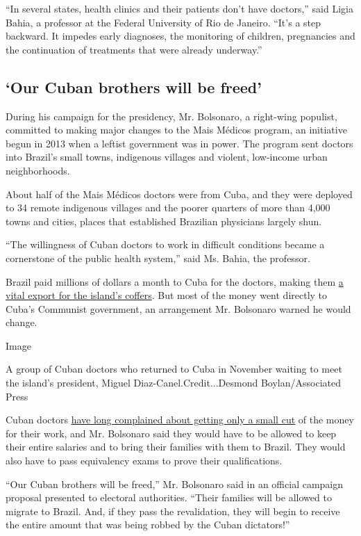``In several states, health clinics and their patients don't have
doctors,'' said Ligia Bahia, a professor at the Federal University of
Rio de Janeiro. ``It's a step backward. It impedes early diagnoses, the
monitoring of children, pregnancies and the continuation of treatments
that were already underway.''

\hypertarget{our-cuban-brothers-will-be-freed}{%
\subsection{`Our Cuban brothers will be
freed'}\label{our-cuban-brothers-will-be-freed}}

During his campaign for the presidency, Mr. Bolsonaro, a right-wing
populist, committed to making major changes to the Mais Médicos program,
an initiative begun in 2013 when a leftist government was in power. The
program sent doctors into Brazil's small towns, indigenous villages and
violent, low-income urban neighborhoods.

About half of the Mais Médicos doctors were from Cuba, and they were
deployed to 34 remote indigenous villages and the poorer quarters of
more than 4,000 towns and cities, places that established Brazilian
physicians largely shun.

``The willingness of Cuban doctors to work in difficult conditions
became a cornerstone of the public health system,'' said Ms. Bahia, the
professor.

Brazil paid millions of dollars a month to Cuba for the doctors, making
them
\href{https://www.nytimes3xbfgragh.onion/2019/03/17/world/americas/venezuela-cuban-doctors.html}{a
vital export for the island's coffers}. But most of the money went
directly to Cuba's Communist government, an arrangement Mr. Bolsonaro
warned he would change.

Image

A group of Cuban doctors who returned to Cuba in November waiting to
meet the island's president, Miguel Diaz-Canel.Credit...Desmond
Boylan/Associated Press

Cuban doctors
\href{https://www.nytimes3xbfgragh.onion/2017/09/29/world/americas/brazil-cuban-doctors-revolt.html}{have
long complained about getting only a small cut} of the money for their
work, and Mr. Bolsonaro said they would have to be allowed to keep their
entire salaries and to bring their families with them to Brazil. They
would also have to pass equivalency exams to prove their qualifications.

``Our Cuban brothers will be freed,'' Mr. Bolsonaro said in an official
campaign proposal presented to electoral authorities. ``Their families
will be allowed to migrate to Brazil. And, if they pass the
revalidation, they will begin to receive the entire amount that was
being robbed by the Cuban dictators!''


